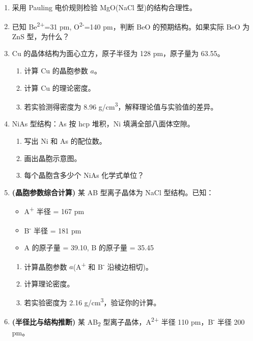 \documentclass[a4paper,11pt]{ctexart}
\providecommand{\tightlist}{\setlength{\itemsep}{0pt}\setlength{\parskip}{0pt}}
\newcommand{\箭}{\ensuremath{\rightarrow}}
\newcommand{\左箭}{\ensuremath{\leftarrow}}
\newcommand{\上箭}{\ensuremath{\uparrow}}
\newcommand{\下箭}{\ensuremath{\downarrow}}
\newcommand{\衡}{\ensuremath{\rightleftharpoons}}
\newcommand{\双箭}{\ensuremath{\leftrightarrow}}
\newcommand{\约等于}{\ensuremath{\approx}}
\newcommand{\小于等于}{\ensuremath{\leq}}
\newcommand{\大于等于}{\ensuremath{\geq}}
\newcommand{\不等于}{\ensuremath{\neq}}
\newcommand{\西格马}{\ensuremath{\sigma}}
\newcommand{\派}{\ensuremath{\pi}}
\begin{document}
\begin{enumerate}
\def\labelenumi{\arabic{enumi}.}
\setcounter{enumi}{14}
\item
  采用 Pauling 电价规则检验 MgO(NaCl 型)的结构合理性。
\item
  已知 Be\textsuperscript{2+}=31 pm, O\textsuperscript{2-}=140 pm，判断 BeO 的预期结构。如果实际 BeO 为 ZnS 型，为什么？
\item
  Cu 的晶体结构为面心立方，原子半径为 128 pm，原子量为 63.55。

  \begin{enumerate}
  \def\labelenumii{(\alph{enumii})}
  \tightlist
  \item
    计算 Cu 的晶胞参数 \(a\)。
  \item
    计算 Cu 的理论密度。
  \item
    若实验测得密度为 8.96 g/cm\textsuperscript{3}，解释理论值与实验值的差异。
  \end{enumerate}
\item
  NiAs 型结构：As 按 hcp 堆积，Ni 填满全部八面体空隙。

  \begin{enumerate}
  \def\labelenumii{(\alph{enumii})}
  \tightlist
  \item
    写出 Ni 和 As 的配位数。
  \item
    画出晶胞示意图。
  \item
    每个晶胞含多少个 NiAs 化学式单位？
  \end{enumerate}
\item
  \textbf{(晶胞参数综合计算)} 某 AB 型离子晶体为 NaCl 型结构。已知：

  \begin{itemize}
  \tightlist
  \item
    A\textsuperscript{+} 半径 = 167 pm
  \item
    B\textsuperscript{-} 半径 = 181 pm
  \item
    A 的原子量 = 39.10, B 的原子量 = 35.45
  \end{itemize}

  \begin{enumerate}
  \def\labelenumii{(\alph{enumii})}
  \tightlist
  \item
    计算晶胞参数 \(a\)(A\textsuperscript{+} 和 B\textsuperscript{-} 沿棱边相切)。
  \item
    计算理论密度。
  \item
    若实验密度为 2.16 g/cm\textsuperscript{3}，验证你的计算。
  \end{enumerate}
\item
  \textbf{(半径比与结构推断)} 某 AB\textsubscript{2} 型离子晶体，A\textsuperscript{2+} 半径 110 pm，B\textsuperscript{-} 半径 200 pm。


\end{enumerate}
\end{document}
